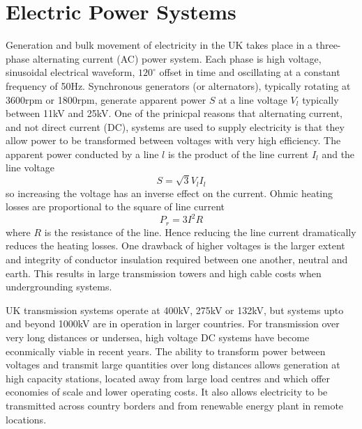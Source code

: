 \section{Electric Power Systems}
Generation and bulk movement of electricity in the UK takes place in a
three-phase alternating current (AC) power system.  Each phase is
high voltage, sinusoidal electrical waveform, $120^\circ$ offset in time
and oscillating at a constant frequency of 50Hz.  Synchronous generators (or
alternators), typically rotating at 3600rpm or 1800rpm, generate apparent power
$S$ at a line voltage $V_l$ typically between
11kV and 25kV.  One of the prinicpal reasons that alternating current, and not
direct current (DC), systems are used to supply electricity is that they allow
power to be transformed between voltages with very high efficiency.  The
apparent power conducted by a line $l$ is the product of the line current
$I_l$ and the line voltage
\begin{equation}
S = \sqrt{3} V_l I_l
\end{equation}
so increasing the voltage has an inverse effect on the current.
Ohmic heating losses are proportional to the square of line current
\begin{equation}
P_{r} = 3 I^2 R
\end{equation}
where $R$ is the resistance of the line.  Hence reducing the line current
dramatically reduces the heating losses.  One drawback of higher voltages
is the larger extent and integrity of conductor insulation required between
one another, neutral and earth.  This results in large transmission towers and
high cable costs when undergrounding systems.

UK transmission systems operate at 400kV, 275kV or 132kV, but systems upto
and beyond 1000kV are in operation in larger countries.  For transmission over
very long distances or undersea, high voltage DC systems have become
econmically viable in recent years.  The ability to transform power between
voltages and transmit large quantities over long distances allows
generation at high capacity stations, located away from large load centres and
which offer economies of scale and lower operating costs.  It also allows
electricity to be transmitted across country borders and from renewable energy
plant in remote locations.

